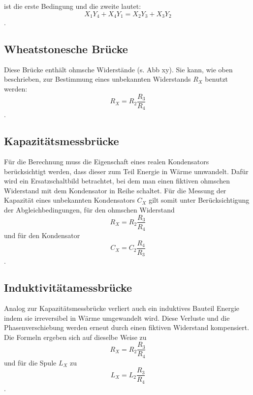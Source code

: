 ist die erste Bedingung und die zweite lautet: 
\begin{equation}
    X_1Y_4 + X_4Y_1 = X_2Y_3 + X_3Y_2 
\end{equation}.

\subsection{Wheatstonesche Brücke}

Diese Brücke enthält ohmsche Widerstände (s. Abb xy). Sie kann, wie oben beschrieben, zur Bestimmung eines unbekannten Widerstands $R_X$ benutzt werden:
\begin{equation}
    R_X = R_2 \frac{R_3}{R_4}
\end{equation}.

\subsection{Kapazitätsmessbrücke}

Für die Berechnung muss die Eigenschaft eines realen Kondensators berücksichtigt werden, dass dieser zum Teil Energie in Wärme umwandelt. Dafür wird ein Ersatzschaltbild betrachtet, bei dem man einen fiktiven ohmschen Widerstand mit dem Kondensator in Reihe schaltet. Für die Messung der Kapazität eines unbekannten Kondensators $C_X$ gilt somit unter Berücksichtigung der Abgleichbedingungen, für den ohmschen Widerstand 
\begin{equation}
    R_X = R_2 \frac{R_3}{R_4}
\end{equation}
und für den Kondensator 
\begin{equation}
    C_X = C_2 \frac{R_4}{R_3}
\end{equation}. 

\subsection{Induktivitätamessbrücke}

Analog zur Kapazitätsmessbrücke verliert auch ein induktives Bauteil Energie indem sie irreversibel in Wärme umgewandelt wird. Diese Verluste und die Phasenverschiebung werden erneut durch einen fiktiven Widerstand kompensiert. Die Formeln ergeben sich auf dieselbe Weise zu 
\begin{equation}
    R_X = R_2 \frac{R_3}{R_4}
\end{equation}
und für die Spule $L_X$ zu 
\begin{equation}
    L_X = L_2 \frac{R_3}{R_4}
\end{equation}.

